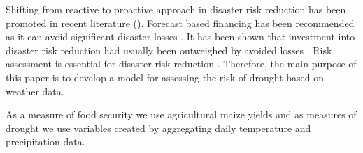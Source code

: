 \documentclass[a4paper,12pt]{article}
\begin{document}
Shifting from reactive to proactive approach in disaster risk reduction has been promoted in recent literature (\citealp{Mechler2005,IPCC2012ch1,Nicholson2017}). Forecast based financing has been recommended as it can avoid significant disaster losses \citep{Nicholson2017}. It has been shown that investment into disaster risk reduction had usually been outweighed by avoided losses \citep{Mechler2005}. Risk assessment is essential for disaster risk reduction \citep{IPCC2012ch1}. Therefore, the main purpose of this paper is to develop a model for assessing the risk of drought based on weather data.

  
As a measure of food security we use agricultural maize yields and as measures of drought we use variables created by aggregating daily temperature and precipitation data.
 
 
\end{document}
